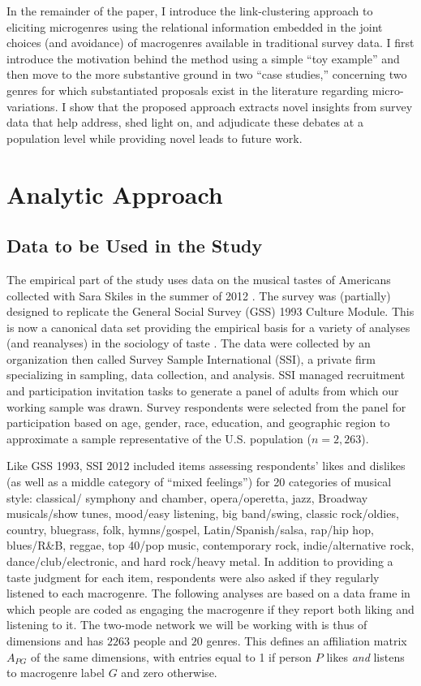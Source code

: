 \documentclass[a4paper,12pt]{extarticle}
\begin{document}
In the remainder of the paper, I introduce the link-clustering approach to eliciting microgenres using the relational information embedded in the joint choices (and avoidance) of macrogenres available in traditional survey data. I first introduce the motivation behind the method using a simple ``toy example'' and then move to the more substantive ground in two ``case studies,'' concerning two genres for which substantiated proposals exist in the literature regarding micro-variations. I show that the proposed approach extracts novel insights from survey data that help address, shed light on, and adjudicate these debates at a population level while providing novel leads to future work. 

\section{Analytic Approach}
\subsection{Data to be Used in the Study}
The empirical part of the study uses data on the musical tastes of Americans collected with Sara Skiles in the summer of 2012 \citep{lizardo_skiles15, lizardo_skiles16}. The survey was (partially) designed to replicate the General Social Survey (GSS) 1993 Culture Module. This is now a canonical data set providing the empirical basis for a variety of analyses (and reanalyses) in the sociology of taste \citep[e.g.,][]{bryson96, goldberg2011mapping, schultz2010strength, han2003unraveling, tampubolon2008revisiting, okada2017structure}.  The data were collected by an organization then called Survey Sample International (SSI), a private firm specializing in sampling, data collection, and analysis. SSI managed recruitment and participation invitation tasks to generate a panel of adults from which our working sample was drawn. Survey respondents were selected from the panel for participation based on age, gender, race, education, and geographic region to approximate a sample representative of the U.S. population ($n = 2,263$). 

Like GSS 1993, SSI 2012 included items assessing respondents’ likes and dislikes (as well as a middle category of ``mixed feelings'') for 20 categories of musical style: classical/ symphony and chamber, opera/operetta, jazz, Broadway musicals/show tunes, mood/easy listening, big band/swing, classic rock/oldies, country, bluegrass, folk, hymns/gospel, Latin/Spanish/salsa, rap/hip hop, blues/R\&B, reggae, top 40/pop music, contemporary rock, indie/alternative rock, dance/club/electronic, and hard rock/heavy metal. In addition to providing a taste judgment for each item, respondents were also asked if they regularly listened to each macrogenre. The following analyses are based on a data frame in which people are coded as engaging the macrogenre if they report both liking and listening to it. The two-mode network we will be working with is thus of dimensions and has $2263$ people and $20$ genres. This defines an affiliation matrix $A_{PG}$ of the same dimensions, with entries equal to 1 if person $P$ likes \textit{and} listens to macrogenre label $G$ and zero otherwise. 
\end{document}
